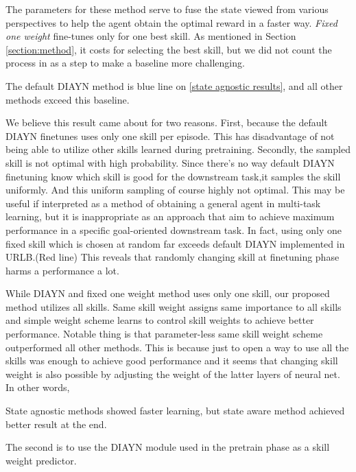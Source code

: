 The parameters for these method serve to fuse the state viewed from various perspectives to help the agent obtain the optimal reward in a faster way.
\emph{Fixed one weight} fine-tunes only for one best skill. As mentioned in Section \ref{section:method}, it costs for selecting the best skill,
but we did not count the process in as a step to make a baseline more challenging.

The default DIAYN method is blue line on \cref*{state agnostic results}, and all other methods exceed this baseline.

We believe this result came about for two reasons.
First, because the default DIAYN finetunes uses only one skill per episode.
This has disadvantage of not being able to utilize other skills learned during pretraining.
Secondly, the sampled skill is not optimal with high probability.
Since there's no way default DIAYN finetuning know which skill is good for the downstream task,it samples the skill uniformly.
And this uniform sampling of course highly not optimal.
This may be useful if interpreted as a method of obtaining a general agent in multi-task learning,
but it is inappropriate as an approach that aim to achieve maximum performance in a specific goal-oriented downstream task.
In fact, using only one fixed skill which is chosen at random far exceeds default DIAYN implemented in URLB.(Red line)
This reveals that randomly changing skill at finetuning phase harms a performance a lot.

While DIAYN and fixed one weight method uses only one skill, our proposed method utilizes all skills.
Same skill weight assigns same importance to all skills and simple weight scheme learns to control skill weights to achieve better performance.
Notable thing is that parameter-less same skill weight scheme outperformed all other methods.
This is because just to open a way to use all the skills was enough to achieve good performance
and it seems that changing skill weight is also possible by adjusting the weight of the latter layers of neural net.
In other words, 

State agnostic methods showed faster learning, but state aware method achieved better result at the end.

The second is to use the DIAYN module used in the pretrain phase as a skill weight predictor.

